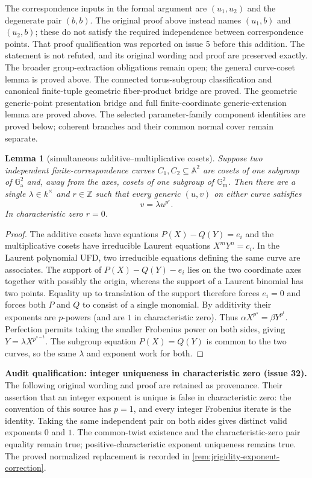\documentclass[11pt,oneside]{article}
\newtheorem{lemma}[theorem]{Lemma}
\theoremstyle{definition}
\theoremstyle{remark}
\newcommand{\Ga}{\mathbb G_{\mathrm a}}
\newcommand{\Gm}{\mathbb G_{\mathrm m}}
\begin{document}
The correspondence inputs in the formal argument are $(u_1,u_2)$ and the degenerate
pair $(b,b)$. The original proof above instead names $(u_1,b)$ and $(u_2,b)$; these do
not satisfy the required independence between correspondence points. That proof
qualification was reported on issue 5 before this addition. The statement is not
refuted, and its original wording and proof are preserved exactly. The broader group-extraction obligations remain open; the general curve-coset lemma is proved above.
The connected torus-subgroup classification and canonical finite-tuple
geometric fiber-product bridge are proved. The geometric generic-point
presentation bridge and full finite-coordinate generic-extension lemma
are proved above. The selected parameter-family component identities
are proved below; coherent branches and their common normal cover remain separate.

\begin{lemma}[simultaneous additive--multiplicative cosets]\label{lem:simultaneous-coset}
Suppose two independent finite-correspondence curves $C_1,C_2\subseteq\mathbb A^2$
are cosets of one subgroup of $\Ga^2$ and, away from the axes, cosets of one subgroup of
$\Gm^2$.  Then there are a single $\lambda\in k^\times$ and $r\in\mathbb Z$ such that
every generic $(u,v)$ on either curve satisfies
\[
 v=\lambda u^{p^r}.                                             \tag{8.9}
\]
In characteristic zero $r=0$.
\end{lemma}
\begin{proof}
The additive cosets have equations
$P(X)-Q(Y)=e_i$ and the multiplicative cosets have irreducible Laurent equations
$X^mY^n=c_i$.  In the Laurent polynomial UFD, two irreducible equations defining the
same curve are associates.  The support of $P(X)-Q(Y)-e_i$ lies on the two coordinate
axes together with possibly the origin, whereas the support of a Laurent binomial has
two points.  Equality up to translation of the support therefore forces $e_i=0$ and
forces both $P$ and $Q$ to consist of a single monomial.  By additivity their exponents
are $p$-powers (and are $1$ in characteristic zero).  Thus
$\alpha X^{p^s}=\beta Y^{p^t}$.  Perfection permits taking the smaller Frobenius power
on both sides, giving $Y=\lambda X^{p^{s-t}}$.  The subgroup equation $P(X)=Q(Y)$ is
common to the two curves, so the same $\lambda$ and exponent work for both.
\end{proof}

\noindent\textbf{Audit qualification: integer uniqueness in characteristic zero (issue 32).}
The following original wording and proof are retained as provenance. Their assertion that
an integer exponent is unique is false in characteristic zero: the convention of this
source has $p=1$, and every integer Frobenius iterate is the identity. Taking the same
independent pair on both sides gives distinct valid exponents $0$ and $1$.
The common-twist existence and the characteristic-zero pair equality remain true;
positive-characteristic exponent uniqueness remains true. The proved normalized
replacement is recorded in \cref{rem:jrigidity-exponent-correction}.
\end{document}
